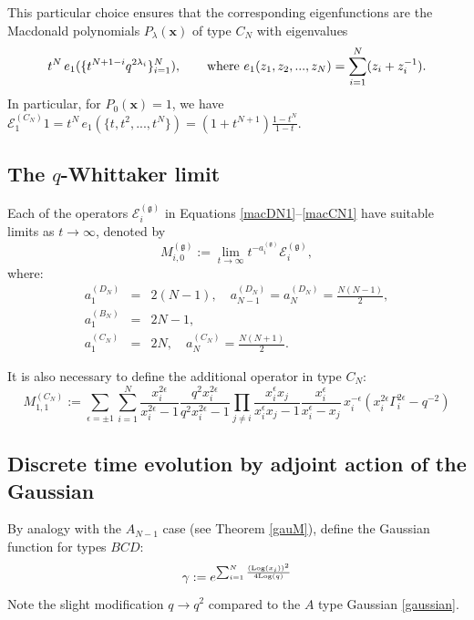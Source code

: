 \documentclass[12pt]{amsart}
\newcommand{\E}{\mathcal E}
\newcommand{\g}{{\mathfrak{g}}}
\newcommand{\bx}{{\mathbf x}}
\numberwithin{equation}{section}
\numberwithin{table}{section}
\begin{document}
This particular choice ensures that the corresponding eigenfunctions are the Macdonald polynomials $P_\lambda(\bx)$ of type $C_N$ with eigenvalues 
$$t^N\, e_1(\{ t^{N+1-i} q^{2\lambda_i}\}_{i=1}^N),\qquad \hbox{where }e_1(z_1,z_2,...,z_N)=\sum_{i=1}^N (z_i+z_i^{-1}).$$
In particular, for $P_0(\bx)=1$, we have ${\mathcal E}_{1}^{(C_N)} 1= t^N\,e_1(\{t,t^2,...,t^{N}\})=(1+t^{N+1})\frac{1-t^{N}}{1-t}$. 

\subsection{The $q$-Whittaker limit}\label{Moperators}

Each of the operators $\E_i^{(\g)}$ in Equations \eqref{macDN1}--\eqref{macCN1} have suitable limits as $t\to\infty$, denoted by
$$M_{i,0}^{(\g)}:=\lim_{t\to\infty} t^{-a_i^{(\g)}} {\mathcal E}_i^{(\g)},$$
where:
\begin{eqnarray*}
a_1^{(D_N)}&=&2(N-1),\quad a_{N-1}^{(D_N)}=a_{N}^{(D_N)}=\frac{N(N-1)}{2},\\
a_1^{(B_N)}&=&2N-1,\\ 
a_1^{(C_N)}&=&2N,\quad a_N^{(C_N)}=\frac{N(N+1)}{2} .
\end{eqnarray*}

It is also necessary to define the additional operator in type $C_N$: 
\begin{equation}\label{macCN2}
M_{1,1}^{(C_N)}:= \sum_{\epsilon=\pm 1}\sum_{i=1}^N \frac{x_i^{2\epsilon}}{x_i^{2\epsilon}-1} 
\frac{q^2 x_i^{2\epsilon}}{q^2 x_i^{2\epsilon}-1} \prod_{j\neq i}  \frac{x_i^{\epsilon}x_j}{x_i^{\epsilon}x_j-1}
 \frac{x_i^{\epsilon}}{x_i^{\epsilon}-x_j} \, x_i^{-\epsilon}(x_i^{2\epsilon} \Gamma_i^{2\epsilon}-q^{-2})
\end{equation}




\subsection{Discrete time evolution by adjoint action of the Gaussian}

By analogy with the $A_{N-1}$ case (see Theorem \ref{gauM}), define the Gaussian function for types $BCD$:
\begin{equation} \gamma:= e^{\sum_{i=1}^N \frac{({\rm Log}(x_i))^2}{4{\rm Log}(q)}}
\end{equation}\label{gau}
{Note the slight modification $q\to q^2$ compared to the $A$ type Gaussian \eqref{gaussian}.} 
\end{document}
